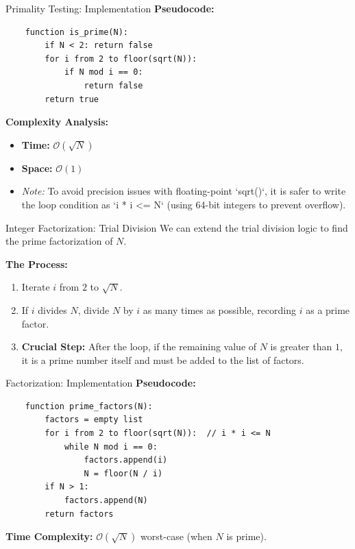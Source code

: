 \documentclass[aspectratio=169]{beamer}
\begin{document}
\begin{frame}[fragile]{Primality Testing: Implementation}
    \textbf{Pseudocode:}
    \begin{verbatim}
    function is_prime(N):
        if N < 2: return false
        for i from 2 to floor(sqrt(N)):
            if N mod i == 0:
                return false 
        return true
    \end{verbatim}
    
    \textbf{Complexity Analysis:}
    \begin{itemize}
        \item \textbf{Time:} $\mathcal{O}(\sqrt{N})$
        \item \textbf{Space:} $\mathcal{O}(1)$
        \item \textit{Note:} To avoid precision issues with floating-point `sqrt()`, it is safer to write the loop condition as `i * i <= N` (using 64-bit integers to prevent overflow).
    \end{itemize}
\end{frame}

\begin{frame}{Integer Factorization: Trial Division}
    We can extend the trial division logic to find the prime factorization of $N$.
    
    \vspace{0.3cm}
    \textbf{The Process:}
    \begin{enumerate}
        \item Iterate $i$ from $2$ to $\sqrt{N}$.
        \item If $i$ divides $N$, divide $N$ by $i$ as many times as possible, recording $i$ as a prime factor.
        \item \textbf{Crucial Step:} After the loop, if the remaining value of $N$ is greater than $1$, it is a prime number itself and must be added to the list of factors.
    \end{enumerate}
\end{frame}

\begin{frame}[fragile]{Factorization: Implementation}
    \textbf{Pseudocode:}
    \begin{verbatim}
    function prime_factors(N):
        factors = empty list
        for i from 2 to floor(sqrt(N)):  // i * i <= N
            while N mod i == 0:
                factors.append(i)
                N = floor(N / i)
        if N > 1:
            factors.append(N)
        return factors
    \end{verbatim}
    \textbf{Time Complexity:} $\mathcal{O}(\sqrt{N})$ worst-case (when $N$ is prime).
\end{frame}
\end{document}
